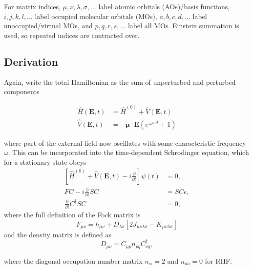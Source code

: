 \documentclass[11pt]{article}
\begin{document}
For matrix indices, \(\mu,\nu,\lambda,\sigma,\dots\) label atomic orbitals (AOs)/basis functions, \(i,j,k,l,\dots\) label occupied molecular orbitals (MOs), \(a,b,c,d,\dots\) label unoccupied/virtual MOs, and \(p,q,r,s,\dots\) label all MOs. Einstein summation is used, so repeated indices are contracted over.

\hypertarget{derivation}{%
\subsection{Derivation}\label{derivation}}

Again, write the total Hamiltonian as the sum of unperturbed and perturbed components

\begin{align}
  \hat{H}(\mathbf{E},t) &= \hat{H}^{(0)} + \hat{V}(\mathbf{E},t) \\
  \hat{V}(\mathbf{E},t) &= -\mathbf{\mu} \cdot \mathbf{E}(e^{\pm i \omega t} + 1)
\end{align}

where part of the external field now oscillates with some characteristic frequency \(\omega\). This can be incorporated into the time-dependent Schrodinger equation, which for a stationary state obeys
\begin{align}
  \left[ \hat{H}^{(0)} + \hat{V}(\mathbf{E},t) - i\frac{\partial}{\partial t} \right] \psi(t) &= 0, \\
  FC - i \frac{\partial}{\partial t} SC &= SC\epsilon, \\
  \frac{\partial}{\partial t} C^{\dagger} S C &= 0,
\end{align}
where the full definition of the Fock matrix is
\[
  F_{\mu\nu} = h_{\mu\nu} + D_{\lambda\sigma}[2J_{\mu\nu\lambda\sigma} - K_{\mu\nu\lambda\sigma}]
\]
and the density matrix is defined as
\[
  D_{\mu\nu} = C_{\mu p}n_{pq}C_{\nu q}^{\dagger},
\]

where the diagonal occupation number matrix \(n_{ii} = 2\) and \(n_{aa} = 0\) for RHF.
\end{document}
